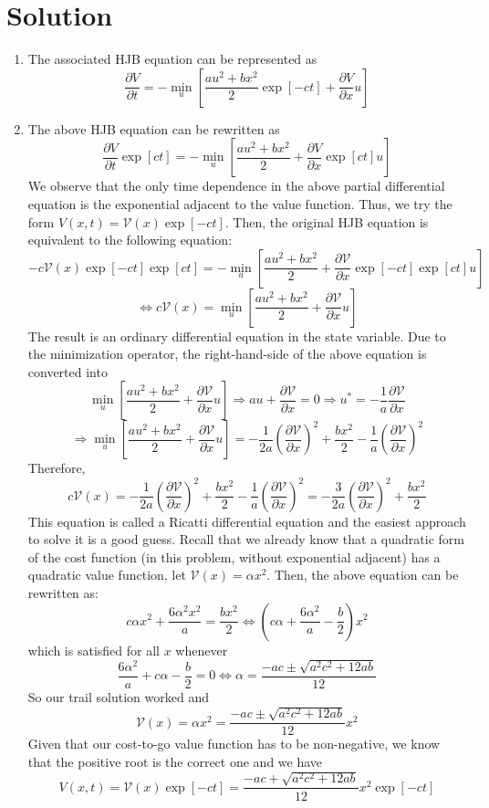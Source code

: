 \documentclass[10pt,a4paper,oneside]{article}
\begin{document}
\section*{Solution}
\begin{enumerate}
\item The associated HJB equation can be represented as
\[
\frac{\partial V}{\partial t}=-\min _{u}\left[\frac{a u^{2}+b x^{2}}{2} \exp [-c t]+\frac{\partial V}{\partial x} u\right]
\]
\item The above HJB equation can be rewritten as
\[
\frac{\partial V}{\partial t} \exp [c t]=-\min _{u}\left[\frac{a u^{2}+b x^{2}}{2}+\frac{\partial V}{\partial x} \exp [c t] u\right]
\]
We observe that the only time dependence in the above partial differential equation is the exponential adjacent to the value function. Thus, we try the form $V(x, t)=\mathcal{V}(x) \exp [-c t] .$ Then, the original HJB equation is equivalent to the following equation:
\[
-c \mathcal{V}(x) \exp [-c t] \exp [c t]=-\min _{u}\left[\frac{a u^{2}+b x^{2}}{2}+\frac{\partial \mathcal{V}}{\partial x} \exp [-c t] \exp [c t] u\right]
\]
\[
\Leftrightarrow c \mathcal{V}(x)=\min _{u}\left[\frac{a u^{2}+b x^{2}}{2}+\frac{\partial \mathcal{V}}{\partial x} u\right]
\]
The result is an ordinary differential equation in the state variable. Due to the minimization
operator, the right-hand-side of the above equation is converted into
\[
\min _{u}\left[\frac{a u^{2}+b x^{2}}{2}+\frac{\partial \mathcal{V}}{\partial x} u\right] \Rightarrow a u+\frac{\partial \mathcal{V}}{\partial x}=0 \Rightarrow u^{*}=-\frac{1}{a} \frac{\partial \mathcal{V}}{\partial x}
\]
\[
\Rightarrow \min _{u}\left[\frac{a u^{2}+b x^{2}}{2}+\frac{\partial \mathcal{V}}{\partial x} u\right]=-\frac{1}{2 a}\left(\frac{\partial \mathcal{V}}{\partial x}\right)^{2}+\frac{b x^{2}}{2}-\frac{1}{a}\left(\frac{\partial \mathcal{V}}{\partial x}\right)^{2}
\]
Therefore,
\[
c \mathcal{V}(x)=-\frac{1}{2 a}\left(\frac{\partial \mathcal{V}}{\partial x}\right)^{2}+\frac{b x^{2}}{2}-\frac{1}{a}\left(\frac{\partial \mathcal{V}}{\partial x}\right)^{2}=-\frac{3}{2 a}\left(\frac{\partial \mathcal{V}}{\partial x}\right)^{2}+\frac{b x^{2}}{2}
\]
This equation is called a Ricatti differential equation and the easiest approach to solve it is a good
guess. Recall that we already know that a quadratic form of the cost function (in this problem,
without exponential adjacent) has a quadratic value function, let $\mathcal{V}(x)=\alpha x^{2}$.  Then, the above equation can be rewritten as:
\[
c \alpha x^{2}+\frac{6 \alpha^{2} x^{2}}{a}=\frac{b x^{2}}{2} \Leftrightarrow\left(c \alpha+\frac{6 \alpha^{2}}{a}-\frac{b}{2}\right) x^{2}
\]
which is satisfied for all $x$ whenever
\[
\frac{6 \alpha^{2}}{a}+c \alpha-\frac{b}{2}=0 \Leftrightarrow \alpha=\frac{-a c \pm \sqrt{a^{2} c^{2}+12 a b}}{12}
\]
So our trail solution worked and
\[
\mathcal{V}(x)=\alpha x^{2}=\frac{-a c \pm \sqrt{a^{2} c^{2}+12 a b}}{12} x^{2}
\]
Given that our cost-to-go value function has to be non-negative, we know that the positive root is
the correct one and we have
\[
V(x, t)=\mathcal{V}(x) \exp [-c t]=\frac{-a c+\sqrt{a^{2} c^{2}+12 a b}}{12} x^{2} \exp [-c t]
\]
\end{enumerate}
\end{document}
